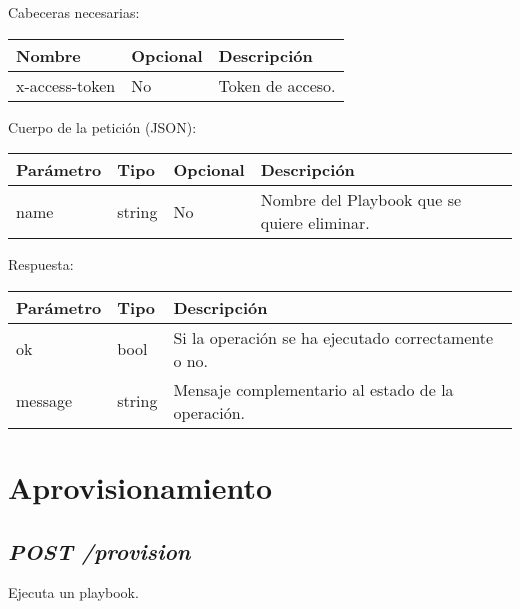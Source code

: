 		Cabeceras necesarias:
		\begin{table}[h!]
			\centering
	\begin{adjustbox}{max width=\textwidth}
			\begin{tabular}{|l|l|l|}
				\hline
				Nombre & Opcional & Descripción \\ \hline
				x-access-token & No & Token de acceso. \\ \hline
			\end{tabular}
\end{adjustbox}
		\end{table}
		
		Cuerpo de la petición (JSON):
		\begin{table}[!h]
			\centering
	\begin{adjustbox}{max width=\textwidth}
			\begin{tabular}{|l|l|l|l|}
				\hline
				Parámetro & Tipo & Opcional & Descripción \\ \hline
				name & string & No & Nombre del Playbook que se quiere eliminar. \\ \hline
			\end{tabular}
\end{adjustbox}
		\end{table}
		
		Respuesta:
		\begin{table}[!h]
			\centering
	\begin{adjustbox}{max width=\textwidth}
			\begin{tabular}{|l|l|l|}
				\hline
				Parámetro & Tipo & Descripción \\ \hline
				ok & bool & Si la operación se ha ejecutado correctamente o no. \\ \hline
				message & string & Mensaje complementario al estado de la operación. \\ \hline
			\end{tabular}
\end{adjustbox}
		\end{table}











\section{Aprovisionamiento}


	\subsection{\textit{POST /provision}}
		Ejecuta un playbook.
	
